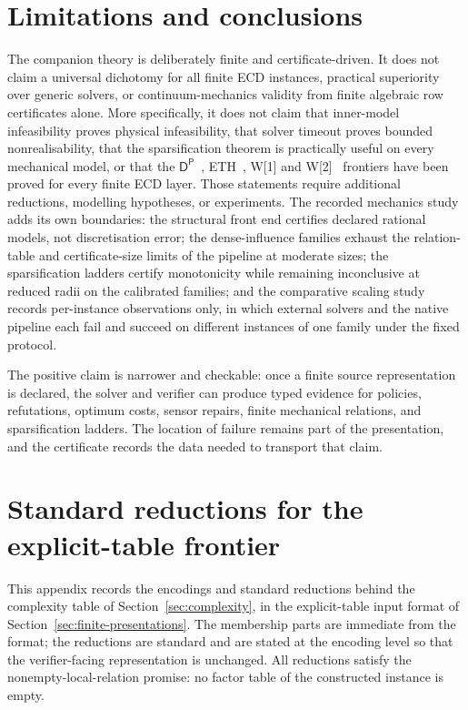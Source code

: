 \documentclass[11pt]{article}
\theoremstyle{plain}
\theoremstyle{definition}
\theoremstyle{remark}
\begin{document}
\section{Limitations and conclusions}
\label{sec:limitations}

The companion theory is deliberately finite and certificate-driven.  It does not
claim a universal dichotomy for all finite ECD instances, practical superiority
over generic solvers, or continuum-mechanics validity from finite algebraic row
certificates alone.  More specifically, it does not claim that inner-model
infeasibility proves physical infeasibility, that solver timeout proves bounded
nonrealisability, that the sparsification theorem is practically useful on every
mechanical model, or that the \(\mathsf
D^{\mathsf P}\)~\cite{papadimitriou94}, ETH~\cite{impagliazzo-paturi01},
W[1] and W[2]~\cite{downey-fellows99}
frontiers have been proved for every finite ECD layer.  Those statements require
additional reductions, modelling hypotheses, or experiments.  The recorded
mechanics study adds its own boundaries: the structural front end certifies
declared rational models, not discretisation error; the dense-influence families
exhaust the relation-table and certificate-size limits of the pipeline at
moderate sizes; the sparsification ladders certify monotonicity while remaining
inconclusive at reduced radii on the calibrated families; and the comparative
scaling study records per-instance observations only, in which external solvers
and the native pipeline each fail and succeed on different instances of one
family under the fixed protocol.

The positive claim is narrower and checkable: once a finite source
representation is declared, the solver and verifier can produce typed evidence
for policies, refutations, optimum costs, sensor repairs, finite mechanical
relations, and sparsification ladders.  The location of failure remains part of
the presentation, and the certificate records the data needed to transport that
claim.



\section{Standard reductions for the explicit-table frontier}
\label{app:reductions}

This appendix records the encodings and standard reductions behind the
complexity table of Section~\ref{sec:complexity}, in the explicit-table
input format of Section~\ref{sec:finite-presentations}.  The membership
parts are immediate from the format; the reductions are standard and are
stated at the encoding level so that the verifier-facing representation is
unchanged.  All reductions satisfy the nonempty-local-relation promise: no
factor table of the constructed instance is empty.
\end{document}
